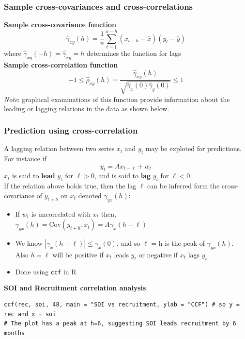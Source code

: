 \documentclass[11pt]{article}
\newcommand{\noi}{\noindent}
\begin{document}
\subsubsection{Sample cross-covariances and cross-correlations}
\noi \textbf{Sample cross-covariance function}
$$\hat \gamma_{xy}(h) = \frac{1}{n}\sum_{t=1}^{n-h}{(x_{t+h} - \bar x)(y_t - \bar y)}$$
\noi where $\hat \gamma_{xy}(-h) = \hat \gamma_{xy} = h$ determines the function for  lags \\

\noi \textbf{Sample cross-correlation function}
$$-1 \leq \hat \rho_{xy}(h) = \frac{\hat \gamma_{xy}(h)}{\sqrt{\hat \gamma_{x}(0) \hat \gamma_y(0)}} \leq 1$$
\noi \textit{Note}: graphical examinations of this function provide information about the leading or lagging relations in the data as shown below.

\subsubsection{Prediction using cross-correlation}
\noi A lagging relation between two series $x_t$ and $y_t$ may be exploted for predictions. For instance if
$$y_t = Ax_{t - \ell} + w_t$$
\noi $x_t$ is said to \textbf{lead} $y_t$ for $\ell > 0$, and is said to \textbf{lag} $y_t$ for $\ell < 0$. \\

\noi If the relation above holds true, then the lag $\ell$ can be inferred form the cross-covariance of $y_{t+h}$ on $x_t$ denoted $\gamma_{yx}(h)$:
\begin{itemize}
    \item If $w_t$ is uncorrelated with $x_t$ then, $\gamma_{yx}(h) = \text{Cov}(y_{t+h}, x_t) = A \gamma_{x}(h - \ell)$
    \item We know $|\gamma_x(h - \ell)| \leq \gamma_x(0)$, and so $\ell$ = h is the peak of $\gamma_{yx}(h)$. Also $h = \ell$ will be positive if $x_t$ leads $y_t$ or negative if $x_t$ lags $y_t$
    \item Done using \texttt{ccf} in R
\end{itemize} \phantom{i}

\noi \textbf{SOI and Recruitment correlation analysis}
\begin{lstlisting}
ccf(rec, soi, 48, main = "SOI vs recruitment, ylab = "CCF") # so y = rec and x = soi
# The plot has a peak at h=6, suggesting SOI leads recruitment by 6 months
\end{lstlisting}
\newpage
\end{document}
